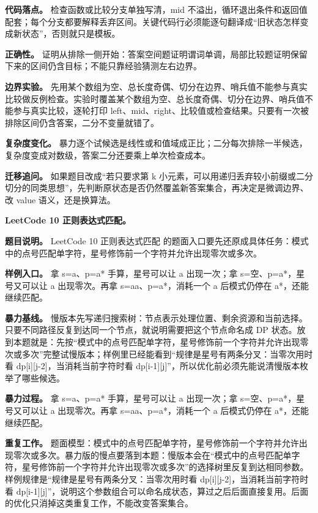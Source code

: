 \textbf{代码落点。} 检查函数或比较分支单独写清，mid 不溢出，循环退出条件和返回值配套；每个分支都要解释丢弃区间。关键代码行必须能逐句翻译成“旧状态怎样变成新状态”，否则就只是模板。

\textbf{正确性。} 证明从排除一侧开始：答案空间题证明谓词单调，局部比较题证明保留下来的区间仍含目标；不能只靠经验猜测左右边界。

\textbf{边界实验。} 先用某个数组为空、总长度奇偶、切分在边界、哨兵值不能参与真实比较做反例检查。实验时覆盖某个数组为空、总长度奇偶、切分在边界、哨兵值不能参与真实比较，逐轮打印 left、mid、right、比较值或检查结果。只要有一次被排除区间仍含答案，二分不变量就错了。

\textbf{复杂度变化。} 暴力逐个试候选是线性或和值域成正比；二分每次排除一半候选，复杂度变成对数级，答案二分还要乘上单次检查成本。

\textbf{迁移追问。} 如果题目改成“若只要求第 k 小元素，可以用递归丢弃较小前缀或二分切分的同类思想”，先判断原状态是否仍然覆盖新答案集合，再决定是微调边界、改 value 语义，还是换算法。

\noindent\textbf{LeetCode 10 正则表达式匹配。}

\textbf{题目说明。} LeetCode 10 正则表达式匹配 的题面入口要先还原成具体任务：模式中的点号匹配单字符，星号修饰前一个字符并允许出现零次或多次。

\textbf{样例入口。} 拿 s=a、p=a* 手算，星号可以让 a 出现一次；拿 s=空、p=a*，星号又可以让 a 出现零次。再拿 s=aa、p=a*，消耗一个 a 后模式仍停在 a*，还能继续匹配。

\textbf{暴力基线。} 慢版本先写递归搜索树：节点表示处理位置、剩余资源和当前选择。只要不同路径反复到达同一个节点，就说明需要把这个节点命名成 DP 状态。放到本题就是：先按“模式中的点号匹配单字符，星号修饰前一个字符并允许出现零次或多次”完整试慢版本；样例里已经能看到“规律是星号有两条分叉：当零次用时看 dp[i][j-2]，当消耗当前字符时看 dp[i-1][j]”，所以优化前必须先能说清慢版本枚举了哪些候选。

\textbf{暴力过程。} 拿 s=a、p=a* 手算，星号可以让 a 出现一次；拿 s=空、p=a*，星号又可以让 a 出现零次。再拿 s=aa、p=a*，消耗一个 a 后模式仍停在 a*，还能继续匹配。

\textbf{重复工作。} 题面模型：模式中的点号匹配单字符，星号修饰前一个字符并允许出现零次或多次。暴力版的慢点要落到本题：慢版本会在“模式中的点号匹配单字符，星号修饰前一个字符并允许出现零次或多次”的选择树里反复到达相同参数。样例规律是“规律是星号有两条分叉：当零次用时看 dp[i][j-2]，当消耗当前字符时看 dp[i-1][j]”，说明这个参数组合可以命名成状态，算过之后后面直接复用。后面的优化只消掉这类重复工作，不能改变答案集合。

